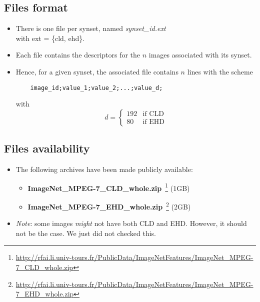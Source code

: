 \documentclass[conference]{IEEEtran}
\newcommand{\midtilde}{\raisebox{-1mm}{\textasciitilde}}
\begin{document}
\subsection{Files format}
\begin{itemize}
	\item There is one file per synset, named \textit{synset\_id.ext}\\ with ext = \{cld, ehd\}.
	\item Each file contains the descriptors for the $n$ images associated with its synset. 
	\item Hence, for a given synset, the associated file contains $n$ lines with the scheme
\begin{verbatim}
	image_id;value_1;value_2;...;value_d;
\end{verbatim}	
with 	
\[
	d = \left\{
		\begin{array}{rc}
			192 & \textrm{if CLD} \\
			 80 & \textrm{if EHD}
		\end{array}
	\right.
\]
\end{itemize}

\subsection{Files availability}
\begin{itemize}
	\item The following archives have been made publicly available:
		\begin{itemize}
			\item \textbf{ImageNet\_MPEG-7\_CLD\_whole.zip}~\footnote{\url{http://rfai.li.univ-tours.fr/PublicData/ImageNetFeatures/ImageNet_MPEG-7_CLD_whole.zip}} (\midtilde 1GB)
			\item \textbf{ImageNet\_MPEG-7\_EHD\_whole.zip}~\footnote{\url{http://rfai.li.univ-tours.fr/PublicData/ImageNetFeatures/ImageNet_MPEG-7_EHD_whole.zip}} (\midtilde 2GB)
		\end{itemize}
		\vspace{1mm}
	\item \textit{Note}: some images \textit{might} not have both CLD and EHD. However, it should not be the case. We just did not checked this.
\end{itemize}








\end{document}
